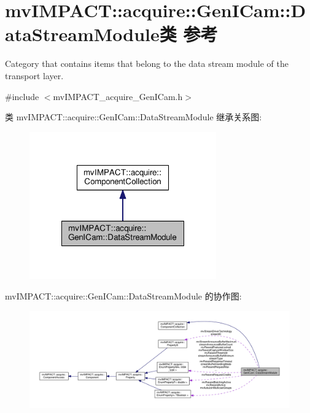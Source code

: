 \hypertarget{classmv_i_m_p_a_c_t_1_1acquire_1_1_gen_i_cam_1_1_data_stream_module}{\section{mv\+I\+M\+P\+A\+C\+T\+:\+:acquire\+:\+:Gen\+I\+Cam\+:\+:Data\+Stream\+Module类 参考}
\label{classmv_i_m_p_a_c_t_1_1acquire_1_1_gen_i_cam_1_1_data_stream_module}
}


Category that contains items that belong to the data stream module of the transport layer.  




{\ttfamily \#include $<$mv\+I\+M\+P\+A\+C\+T\+\_\+acquire\+\_\+\+Gen\+I\+Cam.\+h$>$}



类 mv\+I\+M\+P\+A\+C\+T\+:\+:acquire\+:\+:Gen\+I\+Cam\+:\+:Data\+Stream\+Module 继承关系图\+:
\nopagebreak
\begin{figure}[H]
\begin{center}
\leavevmode
\includegraphics[width=228pt]{classmv_i_m_p_a_c_t_1_1acquire_1_1_gen_i_cam_1_1_data_stream_module__inherit__graph}
\end{center}
\end{figure}


mv\+I\+M\+P\+A\+C\+T\+:\+:acquire\+:\+:Gen\+I\+Cam\+:\+:Data\+Stream\+Module 的协作图\+:
\nopagebreak
\begin{figure}[H]
\begin{center}
\leavevmode
\includegraphics[width=350pt]{classmv_i_m_p_a_c_t_1_1acquire_1_1_gen_i_cam_1_1_data_stream_module__coll__graph}
\end{center}
\end{figure}
